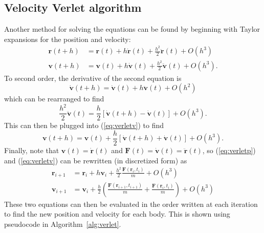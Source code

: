 \documentclass[aps,prc,reprint,nobalancelastpage]{revtex4-1}
\begin{document}
    \subsection{Velocity Verlet algorithm}
    \label{sub:verlet}

        Another method for solving the equations can be found by beginning with Taylor expansions for the position and velocity: \cite{Hjorth-Jensen2016}
        \begin{align}
            \mathbf{r}(t+h) &= \mathbf{r}(t) + h \dot{\mathbf{r}}(t) + \frac{h^2}{2}\ddot{\mathbf{r}}(t) + O(h^3) \label{eq:verletp}\\
            \mathbf{v}(t+h) &= \mathbf{v}(t) + h \dot{\mathbf{v}}(t) + \frac{h^2}{2}\ddot{\mathbf{v}}(t) + O(h^3). \label{eq:verletv}
        \end{align}
        To second order, the derivative of the second equation is
        \begin{equation*}
            \dot{\mathbf{v}}(t+h) = \dot{\mathbf{v}}(t) + h \ddot{\mathbf{v}}(t) + O(h^2)
        \end{equation*}
        which can be rearranged to find
        \begin{equation*}
            \frac{h^2}{2}\ddot{\mathbf{v}}(t) = \frac{h}{2} [\dot{\mathbf{v}}(t+h) - \dot{\mathbf{v}}(t)] + O(h^3).
        \end{equation*}
        This can then be plugged into (\ref{eq:verletv}) to find
        \begin{equation*}
            \mathbf{v}(t+h) = \mathbf{v}(t) + \frac{h}{2} [\dot{\mathbf{v}}(t+h) + \dot{\mathbf{v}}(t)] + O(h^3).
        \end{equation*}
        Finally, note that $\mathbf{v}(t) = \dot{\mathbf{r}}(t)$ and $\mathbf{F}(t) = \dot{\mathbf{v}}(t) = \ddot{\mathbf{r}}(t)$, so (\ref{eq:verletp}) and (\ref{eq:verletv}) can be rewritten (in discretized form) as
        \begin{align}
            \mathbf{r}_{i+1} &= \mathbf{r}_i + h\mathbf{v}_i + \frac{h^2}{2} \frac{\mathbf{F}(\mathbf{r}_i, t_i)}{m} + O(h^3) \\
            \mathbf{v}_{i+1} &= \mathbf{v}_i + \frac{h}{2} \left(\frac{\mathbf{F}(\mathbf{r}_{i+1}, t_{i+1})}{m} + \frac{\mathbf{F}(\mathbf{r}_i, t_i)}{m}\right) + O(h^3)
        \end{align}
        These two equations can then be evaluated in the order written at each iteration to find the new position and velocity for each body. \cite{Hjorth-Jensen2016} This is shown using pseudocode in Algorithm~\ref{alg:verlet}.
\end{document}

